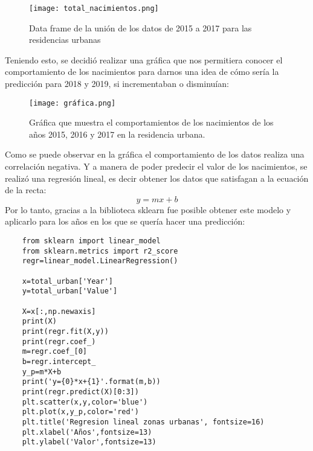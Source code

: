 \documentclass{article}
\begin{document}
\begin{figure}[h]
    \centering
    \texttt{[image: total\_nacimientos.png]}
    \caption{Data frame de la unión de los datos de 2015 a 2017 para las residencias urbanas}
    \label{fig:my_label}
\end{figure}

\noindent Teniendo esto, se decidió realizar una gráfica que nos permitiera conocer el comportamiento de los nacimientos para darnos una idea de cómo sería la predicción para 2018 y 2019, si  incrementaban o disminuían:
\begin{figure}[h]
    \centering
    \texttt{[image: gráfica.png]}
    \caption{Gráfica que muestra el comportamientos de los nacimientos de los años 2015, 2016 y 2017 en la residencia urbana.}
    \label{fig:my_label}
\end{figure}

\clearpage
Como se puede observar en la gráfica el comportamiento de los datos realiza una correlación negativa. Y a manera de poder predecir el valor de los nacimientos, se realizó una regresión lineal, es decir obtener los datos que satisfagan a la ecuación de la recta:
\begin{equation}
    y= mx+b
\end{equation}
Por lo tanto, gracias a la biblioteca sklearn fue posible obtener este modelo y aplicarlo para los años en los que se quería hacer una predicción: 
\begin{lstlisting}
    from sklearn import linear_model
    from sklearn.metrics import r2_score
    regr=linear_model.LinearRegression()

    x=total_urban['Year']
    y=total_urban['Value']

    X=x[:,np.newaxis]
    print(X)
    print(regr.fit(X,y))
    print(regr.coef_)
    m=regr.coef_[0]
    b=regr.intercept_
    y_p=m*X+b
    print('y={0}*x+{1}'.format(m,b))
    print(regr.predict(X)[0:3])
    plt.scatter(x,y,color='blue')
    plt.plot(x,y_p,color='red')
    plt.title('Regresion lineal zonas urbanas', fontsize=16)
    plt.xlabel('Años',fontsize=13)
    plt.ylabel('Valor',fontsize=13)
\end{lstlisting}\\
\end{document}
